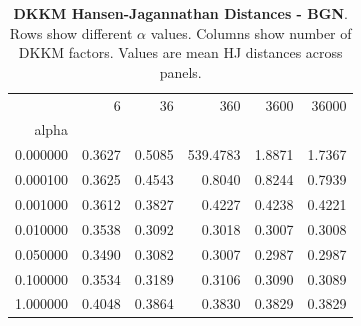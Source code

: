 \begin{table}[h]
\centering
\begin{tabular}{rrrrrr}
\toprule
 & 6 & 36 & 360 & 3600 & 36000 \\
alpha &  &  &  &  &  \\
\midrule
0.000000 & 0.3627 & 0.5085 & 539.4783 & 1.8871 & 1.7367 \\
0.000100 & 0.3625 & 0.4543 & 0.8040 & 0.8244 & 0.7939 \\
0.001000 & 0.3612 & 0.3827 & 0.4227 & 0.4238 & 0.4221 \\
0.010000 & 0.3538 & 0.3092 & 0.3018 & 0.3007 & 0.3008 \\
0.050000 & 0.3490 & 0.3082 & 0.3007 & 0.2987 & 0.2987 \\
0.100000 & 0.3534 & 0.3189 & 0.3106 & 0.3090 & 0.3089 \\
1.000000 & 0.4048 & 0.3864 & 0.3830 & 0.3829 & 0.3829 \\
\bottomrule
\end{tabular}
\caption{\textbf{DKKM Hansen-Jagannathan Distances - BGN}.
    Rows show different $\alpha$ values. Columns show number of DKKM factors.
    Values are mean HJ distances across panels.}
\label{tab:dkkm_hjd_bgn}

\end{table}